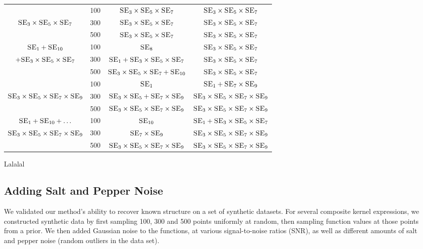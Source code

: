 \documentclass[a4paper,12pt ]{report}
\begin{document}
\begin{table}[h]
\begin{center}
{\begin{tabular}{|c |  c |  c | c | }
 &100& $\textsc{SE}_{3} \times \textsc{SE}_{5} \times \textsc{SE}_{7} $ & $\textsc{SE}_{3} \times \textsc{SE}_{5} \times \textsc{SE}_{7}$ \\
$\textsc{SE}_{3} \times \textsc{SE}_{5} \times \textsc{SE}_{7} $ & 300& $\textsc{SE}_{3} \times \textsc{SE}_{5} \times \textsc{SE}_{7}$ &$\textsc{SE}_{3} \times \textsc{SE}_{5} \times \textsc{SE}_{7}$ \\
& 500& $\textsc{SE}_{3} \times \textsc{SE}_{5} \times \textsc{SE}_{7}$ &$\textsc{SE}_{3} \times \textsc{SE}_{5} \times \textsc{SE}_{7}$ \\ \hline
$\textsc{SE}_{1} +  \textsc{SE}_{10} $ &100& $\textsc{SE}_{8}$ &$\textsc{SE}_{3} \times \textsc{SE}_{5} \times \textsc{SE}_{7}$ \\
$ + \textsc{SE}_{3} \times \textsc{SE}_{5} \times \textsc{SE}_{7}  $ & 300& $\textsc{SE}_{1} + \textsc{SE}_{3} \times \textsc{SE}_{5} \times \textsc{SE}_{7}$ &$\textsc{SE}_{3} \times \textsc{SE}_{5} \times \textsc{SE}_{7}$ \\
& 500& $\textsc{SE}_{3} \times \textsc{SE}_{5} \times \textsc{SE}_{7} + \textsc{SE}_{10}$ &$\textsc{SE}_{3} \times \textsc{SE}_{5} \times \textsc{SE}_{7}$ \\ \hline
&100& $\textsc{SE}_{1}$ &$\textsc{SE}_{1} + \textsc{SE}_{7} \times \textsc{SE}_{9}$ \\
$\textsc{SE}_{3} \times \textsc{SE}_{5} \times \textsc{SE}_{7} \times \textsc{SE}_{9} $ & 300& $\textsc{SE}_{3} \times \textsc{SE}_{5} + \textsc{SE}_{7} \times \textsc{SE}_{9}$ &$\textsc{SE}_{3} \times \textsc{SE}_{5} \times \textsc{SE}_{7} \times \textsc{SE}_{9}$ \\
& 500& $\textsc{SE}_{3} \times \textsc{SE}_{5} \times \textsc{SE}_{7} \times \textsc{SE}_{9}$ &$\textsc{SE}_{3} \times \textsc{SE}_{5} \times \textsc{SE}_{7} \times \textsc{SE}_{9}$ \\ \hline
$ \textsc{SE}_{1} + \textsc{SE}_{10} + \ldots $&100& $\textsc{SE}_{10}$ &$\textsc{SE}_{1} + \textsc{SE}_{3} \times \textsc{SE}_{5} \times \textsc{SE}_{7}$ \\
$ \textsc{SE}_{3} \times \textsc{SE}_{5} \times \textsc{SE}_{7} \times \textsc{SE}_{9}  $  & 300& $\textsc{SE}_{7} \times \textsc{SE}_{9}$ &$\textsc{SE}_{3} \times \textsc{SE}_{5} \times \textsc{SE}_{7} \times \textsc{SE}_{9}$ \\
 & 500& $\textsc{SE}_{3} \times \textsc{SE}_{5} \times \textsc{SE}_{7} \times \textsc{SE}_{9}$ &$\textsc{SE}_{3} \times \textsc{SE}_{5} \times \textsc{SE}_{7} \times \textsc{SE}_{9}$ \\
\hline
\end{tabular}
}     

 \end{center}

\end{table}


Lalalal


\subsection{Adding Salt and Pepper Noise}

We validated our method's ability to recover known structure on a set of synthetic datasets.
For several composite kernel expressions, we constructed synthetic data by first sampling 100, 300 and 500 points uniformly at random, then sampling function values at those points from a \gp{} prior.
We then added \iid Gaussian noise to the functions, at various signal-to-noise ratios (SNR), as well as different amounts of salt and pepper noise (random outliers in the data set). 
\end{document}
